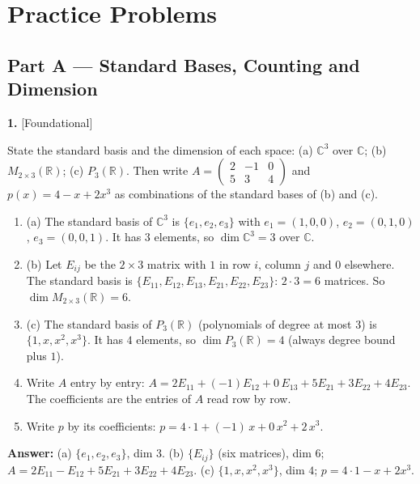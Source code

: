 \documentclass[11pt]{article}
\begin{document}
\section*{\large\color{ink} Practice Problems}
\subsection*{\normalsize\color{ink} Part A --- Standard Bases, Counting and Dimension}
\begin{minipage}{\linewidth}\textbf{1.} \hfill{\scriptsize\color{ink}[Foundational]}\par\nopagebreak State the standard basis and the dimension of each space: (a) $\mathbb{C}^{3}$ over $\mathbb{C}$; (b) $M_{2\times3}(\mathbb{R})$; (c) $P_{3}(\mathbb{R})$. Then write $A=\begin{pmatrix}2&-1&0\\5&3&4\end{pmatrix}$ and $p(x)=4-x+2x^{3}$ as combinations of the standard bases of (b) and (c).
\end{minipage}\par\nopagebreak
\begin{tcolorbox}[breakable,colback=ans,colframe=ansb,boxrule=0.5pt,left=4pt,right=4pt,top=2pt,bottom=2pt]\begin{enumerate}[leftmargin=3.1em,itemsep=1pt,topsep=1pt,label=\textbf{Step \arabic*.}]\item (a) The standard basis of $\mathbb{C}^{3}$ is $\{e_1,e_2,e_3\}$ with $e_1=(1,0,0)$, $e_2=(0,1,0)$, $e_3=(0,0,1)$. It has $3$ elements, so $\dim\mathbb{C}^{3}=3$ over $\mathbb{C}$.
\item (b) Let $E_{ij}$ be the $2\times3$ matrix with $1$ in row $i$, column $j$ and $0$ elsewhere. The standard basis is $\{E_{11},E_{12},E_{13},E_{21},E_{22},E_{23}\}$: $2\cdot3=6$ matrices. So $\dim M_{2\times3}(\mathbb{R})=6$.
\item (c) The standard basis of $P_3(\mathbb{R})$ (polynomials of degree at most $3$) is $\{1,x,x^{2},x^{3}\}$. It has $4$ elements, so $\dim P_3(\mathbb{R})=4$ (always degree bound plus $1$).
\item Write $A$ entry by entry: $A=2E_{11}+(-1)E_{12}+0\,E_{13}+5E_{21}+3E_{22}+4E_{23}$. The coefficients are the entries of $A$ read row by row.
\item Write $p$ by its coefficients: $p=4\cdot1+(-1)\,x+0\,x^{2}+2\,x^{3}$.
\end{enumerate}\textbf{Answer:} (a) $\{e_1,e_2,e_3\}$, dim $3$. (b) $\{E_{ij}\}$ (six matrices), dim $6$; $A=2E_{11}-E_{12}+5E_{21}+3E_{22}+4E_{23}$. (c) $\{1,x,x^{2},x^{3}\}$, dim $4$; $p=4\cdot1-x+2x^{3}$.\end{tcolorbox}
\end{document}
